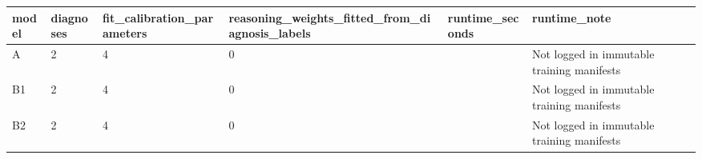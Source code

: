 \begin{tabular}{llllll}
\hline
model & diagnoses & fit\_calibration\_parameters & reasoning\_weights\_fitted\_from\_diagnosis\_labels & runtime\_seconds & runtime\_note \\
\hline
A & 2 & 4 & 0 &  & Not logged in immutable training manifests \\
B1 & 2 & 4 & 0 &  & Not logged in immutable training manifests \\
B2 & 2 & 4 & 0 &  & Not logged in immutable training manifests \\
\hline
\end{tabular}
